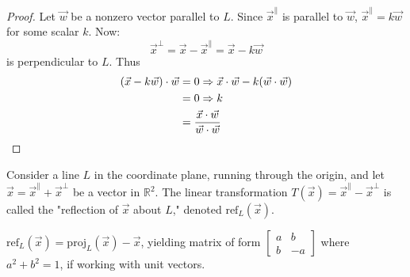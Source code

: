 \documentclass[a4paper,11pt]{article}
\begin{document}
\begin{outline}
    \begin{proof}
      Let \(\vec{w}\) be a nonzero vector parallel to \(L\). Since \(\vec{x}^{\parallel}\) is parallel to \(\vec{w}\),
      \(\vec{x}^{\parallel} = k\vec{w}\) for some scalar \(k\). Now:
      \[
        \vec{x}^{\perp} = \vec{x} - \vec{x}^{\parallel} = \vec{x} - k\vec{w}
      \]
      is perpendicular to \(L\). Thus
      \begin{align*}
        (\vec{x} - k\vec{w}) \cdot \vec{w} &= 0 \Rightarrow \vec{x}\cdot\vec{w} - k(\vec{w}\cdot\vec{w})\\
                                           &= 0 \Rightarrow k\\
                                           &= \frac{\vec{x}\cdot\vec{w}}{\vec{w}\cdot\vec{w}}
      \end{align*}
    \end{proof}

    Consider a line \(L\) in the coordinate plane, running through the origin, and let 
    \(\vec{x} = \vec{x}^{\parallel} + \vec{x}^{\perp}\) be a vector in \(\mathbb{R}^2\). The linear transformation
    \(T(\vec{x}) = \vec{x}^{\parallel} - \vec{x}^{\perp}\) is called the "reflection of \(\vec{x}\) about \(L\)," 
    denoted \(\text{ref}_{L}(\vec{x})\).
    
    \(\text{ref}_{L}(\vec{x}) = \text{proj}_{L}(\vec{x}) - \vec{x}\), yielding matrix of form 
    \(\begin{bmatrix} a&b\\ b&-a \end{bmatrix}\) where \(a^2 + b^2 = 1\), if working with unit vectors.
    

\end{outline}
\end{document}
